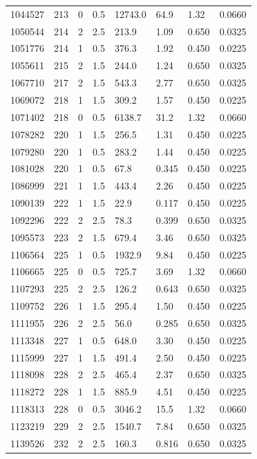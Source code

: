 \documentclass[preview]{standalone}
\begin{document}
{{{{{{{\begin{tabular}{L{1.2cm}C{1.2cm} C{0.3cm}C{0.5cm} C{1.4cm}C{1.4cm} C{1.4cm}C{1.4cm}}
  1044527  &   213  & 0     & 0.5 &  12743.0  & 64.9  & 1.32 &  0.0660   \\ 
  1050544  &   214  & 2     & 2.5 &  213.9  & 1.09  & 0.650 &  0.0325   \\ 
  1051776  &   214  & 1     & 0.5 &  376.3  & 1.92  & 0.450 &  0.0225   \\ 
  1055611  &   215  & 2     & 1.5 &  244.0  & 1.24  & 0.650 &  0.0325   \\ 
  1067710  &   217  & 2     & 1.5 &  543.3  & 2.77  & 0.650 &  0.0325   \\ 
  1069072  &   218  & 1     & 1.5 &  309.2  & 1.57  & 0.450 &  0.0225   \\ 
  1071402  &   218  & 0     & 0.5 &  6138.7  & 31.2  & 1.32 &  0.0660   \\ 
  1078282  &   220  & 1     & 1.5 &  256.5  & 1.31  & 0.450 &  0.0225   \\ 
  1079280  &   220  & 1     & 0.5 &  283.2  & 1.44  & 0.450 &  0.0225   \\ 
  1081028  &   220  & 1     & 0.5 &  67.8  & 0.345  & 0.450 &  0.0225   \\ 
  1086999  &   221  & 1     & 1.5 &  443.4  & 2.26  & 0.450 &  0.0225   \\ 
  1090139  &   222  & 1     & 1.5 &  22.9  & 0.117  & 0.450 &  0.0225   \\ 
  1092296  &   222  & 2     & 2.5 &  78.3  & 0.399  & 0.650 &  0.0325   \\ 
  1095573  &   223  & 2     & 1.5 &  679.4  & 3.46  & 0.650 &  0.0325   \\ 
  1106564  &   225  & 1     & 0.5 &  1932.9  & 9.84  & 0.450 &  0.0225   \\ 
  1106665  &   225  & 0     & 0.5 &  725.7  & 3.69  & 1.32 &  0.0660   \\ 
  1107293  &   225  & 2     & 2.5 &  126.2  & 0.643  & 0.650 &  0.0325   \\ 
  1109752  &   226  & 1     & 1.5 &  295.4  & 1.50  & 0.450 &  0.0225   \\ 
  1111955  &   226  & 2     & 2.5 &  56.0  & 0.285  & 0.650 &  0.0325   \\ 
  1113348  &   227  & 1     & 0.5 &  648.0  & 3.30  & 0.450 &  0.0225   \\ 
  1115999  &   227  & 1     & 1.5 &  491.4  & 2.50  & 0.450 &  0.0225   \\ 
  1118098  &   228  & 2     & 2.5 &  465.4  & 2.37  & 0.650 &  0.0325   \\ 
  1118272  &   228  & 1     & 1.5 &  885.9  & 4.51  & 0.450 &  0.0225   \\ 
  1118313  &   228  & 0     & 0.5 &  3046.2  & 15.5  & 1.32 &  0.0660   \\ 
  1123219  &   229  & 2     & 2.5 &  1540.7  & 7.84  & 0.650 &  0.0325   \\ 
  1139526  &   232  & 2     & 2.5 &  160.3  & 0.816  & 0.650 &  0.0325   \\ 
\hline 
\end{tabular} 

}}}}}}}
\end{document}
